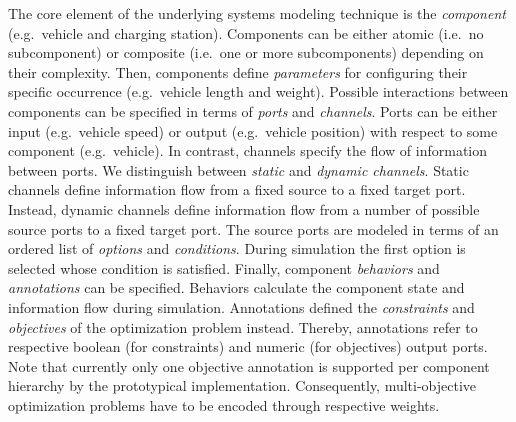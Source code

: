 The core element of the underlying systems modeling technique is the \textit{component} (e.g.\ vehicle and charging station). Components can be either atomic (i.e.\ no subcomponent) or composite (i.e.\ one or more subcomponents) depending on their complexity. Then, components define \textit{parameters} for configuring their specific occurrence (e.g.\ vehicle length and weight). Possible interactions between components can be specified in terms of \textit{ports} and \textit{channels}. Ports can be either input (e.g.\ vehicle speed) or output (e.g.\ vehicle position) with respect to some component (e.g.\ vehicle). In contrast, channels specify the flow of information between ports. We distinguish between \textit{static} and \textit{dynamic channels}. Static channels define information flow from a fixed source to a fixed target port. Instead, dynamic channels define information flow from a number of possible source ports to a fixed target port. The source ports are modeled in terms of an ordered list of \textit{options} and \textit{conditions}. During simulation the first option is selected whose condition is satisfied. Finally, component \textit{behaviors} and \textit{annotations} can be specified. Behaviors calculate the component state and information flow during simulation. Annotations defined the \textit{constraints} and \textit{objectives} of the optimization problem instead. Thereby, annotations refer to respective boolean (for constraints) and numeric (for objectives) output ports. Note that currently only one objective annotation is supported per component hierarchy by the prototypical implementation. Consequently, multi-objective optimization problems have to be encoded through respective weights.